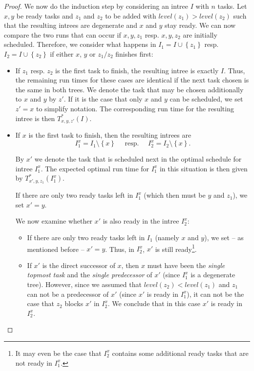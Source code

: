 \begin{proof}
  We now do the induction step by considering an intree $I$ with $n$ tasks. 
  Let $x,y$ be ready tasks and $z_1$ and $z_2$ to be added with $level(z_1) > level(z_2)$ such that the resulting intrees are degenerate and $x$ and $y$ stay ready.
  We can now compare the two runs that can occur if $x,y,z_1$ resp. $x,y,z_2$ are initially scheduled. 
  Therefore, we consider what happens in $I_1=I\cup\left\{ z_1 \right\}$ resp. $I_2=I\cup\left\{ z_2 \right\}$ if either $x$, $y$ or $z_1/z_2$ finishes first:

  \begin{itemize}
  \item If $z_1$ resp. $z_2$ is the first task to finish, the resulting intree is exactly $I$. Thus, the remaining run times for these cases are identical if the next task chosen is the same in both trees. We denote the task that may be chosen additionally to $x$ and $y$ by $z'$. If it is the case that only $x$ and $y$ can be scheduled, we set $z'=x$ to simplify notation. The corresponding run time for the resulting intree is then $T^*_{x,y,z'}(I)$.

  \item If $x$ is the first task to finish, then the resulting intrees are 
    \begin{equation*}
      I^x_{1}=I_1\setminus\left\{ x \right\} \quad \text{ resp. } \quad I^x_{2}=I_2\setminus\left\{ x \right\}.
    \end{equation*}

    By $x'$ we denote the task that is scheduled next in the optimal schedule for intree $I_1^x$. 
    The expected optimal run time for $I_1^x$ in this situation is then given by $T_{x',y,z_1}^*(I_1^x)$.

    If there are only two ready tasks left in $I_1^x$ (which then must be $y$ and $z_1$), we set $x'=y$. 

    We now examine whether $x'$ is also ready in the intree $I_2^x$:
    \begin{itemize}
    \item If there are only two ready tasks left in $I_1$ (namely $x$ and $y$), we set -- as mentioned before -- $x'=y$. Thus, in $I_2^x$, $x'$ is still ready\footnote{It may even be the case that $I_2^x$ contains some additional ready tasks that are not ready in $I_1^x$.}.
    \item If $x'$ is the direct successor of $x$, then $x$ must have been the \emph{single topmost task} and the \emph{single predecessor} of $x'$ (since $I_1^x$ is a degenerate tree). However, since we assumed that $level(z_2)<level(z_1)$ and $z_1$ can not be a predecessor of $x'$ (since $x'$ is ready in $I_1^x$), it can not be the case that $z_2$ blocks $x'$ in $I_2^x$. We conclude that in this case $x'$ is ready in $I_2^x$.


\end{itemize}
\end{itemize}
\end{proof}
